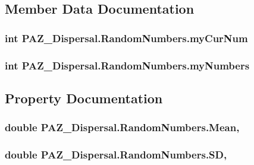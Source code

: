 \subsection{Member Data Documentation}
\hypertarget{class_p_a_z___dispersal_1_1_random_numbers_a941f8bee25446bd596c21ad54b3769b6}{
\subsubsection[{my\-Cur\-Num}]{\setlength{\rightskip}{0pt plus 5cm}int P\-A\-Z\-\_\-\-Dispersal.\-Random\-Numbers.\-my\-Cur\-Num}}\label{class_p_a_z___dispersal_1_1_random_numbers_a941f8bee25446bd596c21ad54b3769b6}
\hypertarget{class_p_a_z___dispersal_1_1_random_numbers_a2c0952f8205bf303c5f5e9d165684710}{
\subsubsection[{my\-Numbers}]{\setlength{\rightskip}{0pt plus 5cm}int P\-A\-Z\-\_\-\-Dispersal.\-Random\-Numbers.\-my\-Numbers}}\label{class_p_a_z___dispersal_1_1_random_numbers_a2c0952f8205bf303c5f5e9d165684710}


\subsection{Property Documentation}
\hypertarget{class_p_a_z___dispersal_1_1_random_numbers_a5e4a630dc1329f061744d140bf0e0646}{
\subsubsection[{Mean}]{\setlength{\rightskip}{0pt plus 5cm}double P\-A\-Z\-\_\-\-Dispersal.\-Random\-Numbers.\-Mean\hspace{0.3cm}{\ttfamily [get]}, {\ttfamily [set]}}}\label{class_p_a_z___dispersal_1_1_random_numbers_a5e4a630dc1329f061744d140bf0e0646}
\hypertarget{class_p_a_z___dispersal_1_1_random_numbers_a842715cc77068c470aab3f2de0985764}{
\subsubsection[{S\-D}]{\setlength{\rightskip}{0pt plus 5cm}double P\-A\-Z\-\_\-\-Dispersal.\-Random\-Numbers.\-S\-D\hspace{0.3cm}{\ttfamily [get]}, {\ttfamily [set]}}}\label{class_p_a_z___dispersal_1_1_random_numbers_a842715cc77068c470aab3f2de0985764}


